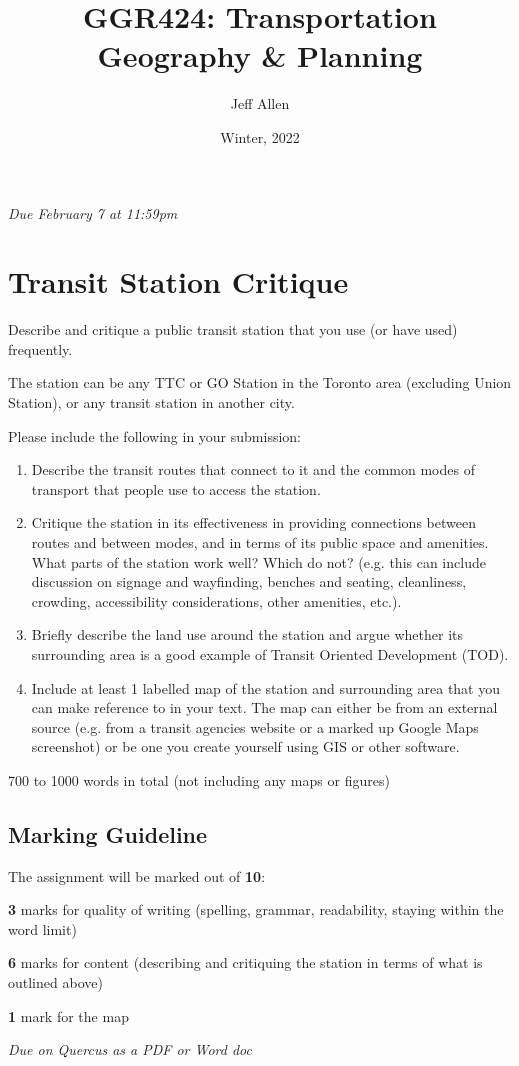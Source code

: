 \documentclass[11pt]{article}
\title{\textbf{GGR424: Transportation Geography \& Planning}}
\author{Jeff Allen}
\date{Winter, 2022}
\begin{document}
	\allsectionsfont{\sffamily}
		
	\textit{Due February 7 at 11:59pm}
		
	\section*{Transit Station Critique}
	
	Describe and critique a public transit station that you use (or have used) frequently. 
	
	The station can be any TTC or GO Station in the Toronto area (excluding Union Station), or any transit station in another city.
	
	Please include the following in your submission:
	
	\begin{enumerate}
		\item Describe the transit routes that connect to it and the common modes of transport that people use to access	the station.
		\item Critique the station in its effectiveness in providing connections between routes and between modes, and in terms of its public space and amenities. What parts of the station work well? Which do not? (e.g. this can include discussion on signage and wayfinding,	benches and seating, cleanliness, crowding, accessibility considerations, other amenities, etc.).
		\item Briefly describe the land use around the station and argue whether its surrounding area is a good example of Transit Oriented Development (TOD).
		\item Include at least 1 labelled map of the station and surrounding area that you can make reference to in your text. The map can either be from an external source (e.g. from a transit agencies website or a marked up Google Maps screenshot) or be one you create yourself using GIS or other software.
	\end{enumerate}
	
	700 to 1000 words in total (not including any maps or figures)

	
	\subsection*{Marking Guideline}
	
	The assignment will be marked out of \textbf{10}:
	
	\textbf{3} marks for quality of writing (spelling, grammar, readability, staying within the word limit)
	
	\textbf{6} marks for content (describing and critiquing the station in terms of what is outlined above)
	
	\textbf{1} mark for the map
	
	\textit{Due on Quercus as a PDF or Word doc}
	
\end{document}
